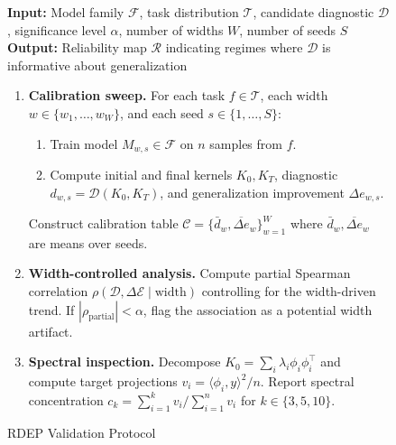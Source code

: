 \documentclass[10pt]{article}
\begin{document}
\begin{figure}[t]
\caption{RDEP Validation Protocol}
\label{fig:rdep}
\small
\textbf{Input:} Model family $\mathcal{F}$, task distribution $\mathcal{T}$, candidate diagnostic $\mathcal{D}$, significance level $\alpha$, number of widths $W$, number of seeds $S$ \\
\textbf{Output:} Reliability map $\mathcal{R}$ indicating regimes where $\mathcal{D}$ is informative about generalization

\begin{enumerate}
    \item \textbf{Calibration sweep.}
    For each task $f \in \mathcal{T}$, each width $w \in \{w_1, \dots, w_W\}$, and each seed $s \in \{1, \dots, S\}$:
    \begin{enumerate}
        \item Train model $M_{w,s} \in \mathcal{F}$ on $n$ samples from $f$.
        \item Compute initial and final kernels $K_0, K_T$, diagnostic $d_{w,s} = \mathcal{D}(K_0, K_T)$, and generalization improvement $\Delta e_{w,s}$.
    \end{enumerate}
    Construct calibration table $\mathcal{C} = \{\bar{d}_w, \overline{\Delta e}_w\}_{w=1}^W$ where $\bar{d}_w, \overline{\Delta e}_w$ are means over seeds.

    \item \textbf{Width-controlled analysis.}
    Compute partial Spearman correlation $\rho(\mathcal{D}, \Delta\mathcal{E} \mid \text{width})$ controlling for the width-driven trend.  If $|\rho_{\text{partial}}| < \alpha$, flag the association as a potential width artifact.

    \item \textbf{Spectral inspection.}
    Decompose $K_0 = \sum_i \lambda_i \phi_i \phi_i^\top$ and compute target projections $v_i = \langle \phi_i, y \rangle^2 / n$.  Report spectral concentration $c_k = \sum_{i=1}^k v_i / \sum_{i=1}^n v_i$ for $k \in \{3, 5, 10\}$.


\end{enumerate}
\end{figure}
\end{document}
